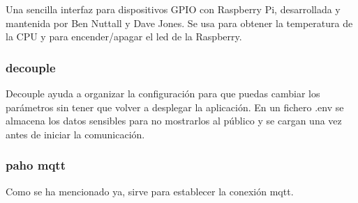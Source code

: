 {Una sencilla interfaz para dispositivos GPIO con Raspberry Pi, desarrollada y mantenida por Ben Nuttall y Dave Jones. Se usa para obtener la temperatura de la CPU y para encender/apagar el led de la Raspberry. \cite{gpiozero}

\subsubsection{decouple}

Decouple ayuda a organizar la configuración para que puedas cambiar los parámetros sin tener que volver a desplegar la aplicación. En un fichero .env se almacena los datos sensibles para no mostrarlos al público y se cargan una vez antes de iniciar la comunicación. \cite{decouple}

\subsubsection{paho mqtt}

Como se ha mencionado ya, sirve para establecer la conexión mqtt. \cite{paho-mqtt}


}